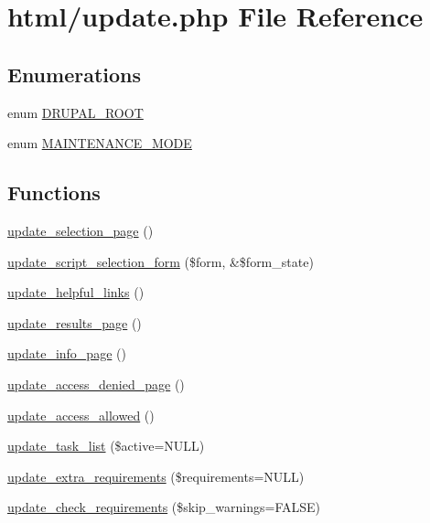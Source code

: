 \hypertarget{update_8php}{
\section{html/update.php File Reference}
\label{update_8php}
}
\subsection*{Enumerations}
\begin{DoxyCompactItemize}
\item 
enum \hyperlink{update_8php_a21cf187d162beffb1fbc5a1d1098f4f9}{DRUPAL\_\-ROOT} 
\item 
enum \hyperlink{update_8php_a5bf6dfe9ba7ee16c648e3932aa76535d}{MAINTENANCE\_\-MODE} 
\end{DoxyCompactItemize}
\subsection*{Functions}
\begin{DoxyCompactItemize}
\item 
\hyperlink{update_8php_a48489df1aa5e2189ef6e7fae71de8203}{update\_\-selection\_\-page} ()
\item 
\hyperlink{update_8php_ab2eb66dd5754e2ae6a3c4828b01d619c}{update\_\-script\_\-selection\_\-form} (\$form, \&\$form\_\-state)
\item 
\hyperlink{update_8php_a8f2fcde5a819a7ddab954d2db972caa4}{update\_\-helpful\_\-links} ()
\item 
\hyperlink{update_8php_ab8c386cf40f35717b820735b5a8f7745}{update\_\-results\_\-page} ()
\item 
\hyperlink{update_8php_a1c9b293ee11117ef8911b52809e75bde}{update\_\-info\_\-page} ()
\item 
\hyperlink{update_8php_aa43f1c9a3442570821ad190a3dd429db}{update\_\-access\_\-denied\_\-page} ()
\item 
\hyperlink{update_8php_a1fc4c34612de9d4097a4c24569f2b789}{update\_\-access\_\-allowed} ()
\item 
\hyperlink{update_8php_a3563d865f4b5eb7e86e9254410438679}{update\_\-task\_\-list} (\$active=NULL)
\item 
\hyperlink{update_8php_a0c14cba656eed6f94996df5798223b9a}{update\_\-extra\_\-requirements} (\$requirements=NULL)
\item 
\hyperlink{update_8php_a2d0a8d0f6385e83fb00d99fb64132d21}{update\_\-check\_\-requirements} (\$skip\_\-warnings=FALSE)
\end{DoxyCompactItemize}
